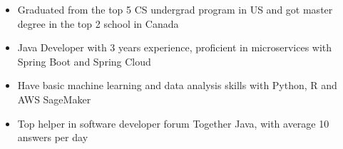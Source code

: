 \documentclass[localFont,alternative]{resume_template}
\begin{document}
	\makecvheader
	   
    \begin{itemize}
        \item Graduated from the top 5 CS undergrad program in US and got master degree in the top 2 school in Canada
        \item Java Developer with 3 years experience, proficient in microservices with Spring Boot and Spring Cloud
        \item Have basic machine learning and data analysis skills with Python, R and AWS SageMaker
        \item Top helper in software developer forum Together Java, with average 10 answers per day
    \end{itemize}

    \vspace{5pt}
\end{document}

